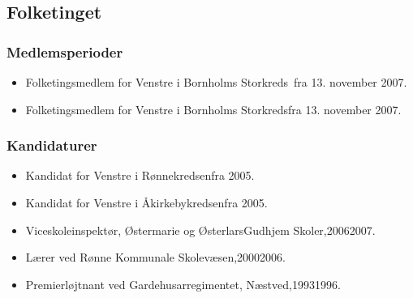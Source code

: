\documentclass[11pt, a4paper]{awesome-cv}
\begin{document}
\begin{cvletter}
\subsection*{Folketinget}
\subsubsection*{Medlemsperioder}
\begin{itemize}
\item Folketingsmedlem for Venstre i Bornholms Storkreds fra 13. november 2007.
\item Folketingsmedlem for Venstre i Bornholms Storkredsfra 13. november 2007.
\end{itemize}
\subsubsection*{Kandidaturer}
\begin{itemize}
\item Kandidat for Venstre i Rønnekredsenfra 2005.
\item Kandidat for Venstre i Åkirkebykredsenfra 2005.
\end{itemize}
\begin{itemize}
\item Viceskoleinspektør, Østermarie og ØsterlarsGudhjem Skoler,20062007.
\item Lærer ved Rønne Kommunale Skolevæsen,20002006.
\item Premierløjtnant ved Gardehusarregimentet, Næstved,19931996.
\end{itemize}
\end{cvletter}
\end{document}

